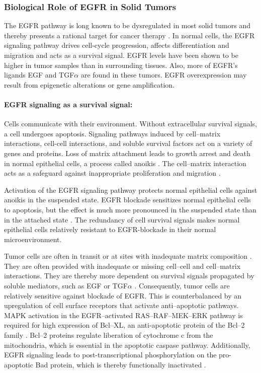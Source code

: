 {{{    \subsubsection{Biological Role of EGFR in Solid Tumors}

      The EGFR pathway is long known to be dysregulated in most solid tumors and
      thereby presents a rational target for cancer therapy {\cite{dysregulated}}. In normal cells,
      the EGFR signaling pathway drives cell-cycle progression,
      affects differentiation and migration and acts as a survival signal. EGFR
      levels have been shown to be higher in tumor samples than in surrounding
      tissues. Also, more of EGFR's ligands EGF and TGF$\alpha$ are found in
      these tumors. EGFR overexpression may result from epigenetic alterations
      or gene amplification.

      \paragraph{EGFR signaling as a survival signal:} Cells communicate with
      their environment. Without extracellular survival signals, a cell undergoes
      apoptosis. Signaling pathways induced by cell--matrix interactions,
      cell-cell interactions, and soluble survival factors act on a variety of
      genes and proteins. Loss of matrix attachment leads to growth arrest
      and death in normal epithelial cells, a process called anoikis {\cite{targeting_2}}. The
      cell--matrix interaction acts as a safeguard against inappropriate
      proliferation and migration {\cite{targeting}}.

      Activation of the EGFR signaling pathway protects normal epithelial
      cells against anoikis in the suspended state. EGFR blockade sensitizes
      normal epithelial cells to apoptosis, but the effect is much more
      pronounced in the suspended state than in the attached state {\cite{targeting_2}} {\cite{targeting_3}}. The
      redundancy of cell survival signals makes normal epithelial cells
      relatively resistant to EGFR-blockade in their normal microenvironment.

      Tumor cells are often in transit or at sites with inadequate matrix
      composition {\cite{targeting_4}}. They are often provided with inadequate or missing cell--cell
      and cell--matrix interactions. They are thereby more dependent on survival
      signals propagated by soluble mediators, such as EGF or TGF$\alpha$ {\cite{targeting}}.
      Consequently, tumor cells are relatively sensitive against blockade of
      EGFR. This is counterbalanced by an upregulation of cell surface receptors
      that activate anti--apoptotic pathways. MAPK activation in the
      EGFR--activated RAS--RAF--MEK--ERK pathway is required for high expression
      of Bcl--XL, an anti-apoptotic protein of the Bcl--2 family {\cite{targeting_5}}. Bcl--2
      proteins regulate liberation of cytochrome c from the mitochondria, which
      is essential in the apoptotic caspase pathway. Additionally, EGFR
      signaling leads to post-transcriptional phosphorylation on the
      pro-apoptotic Bad protein, which is thereby functionally inactivated {\cite{targeting_3}}.

}}}
